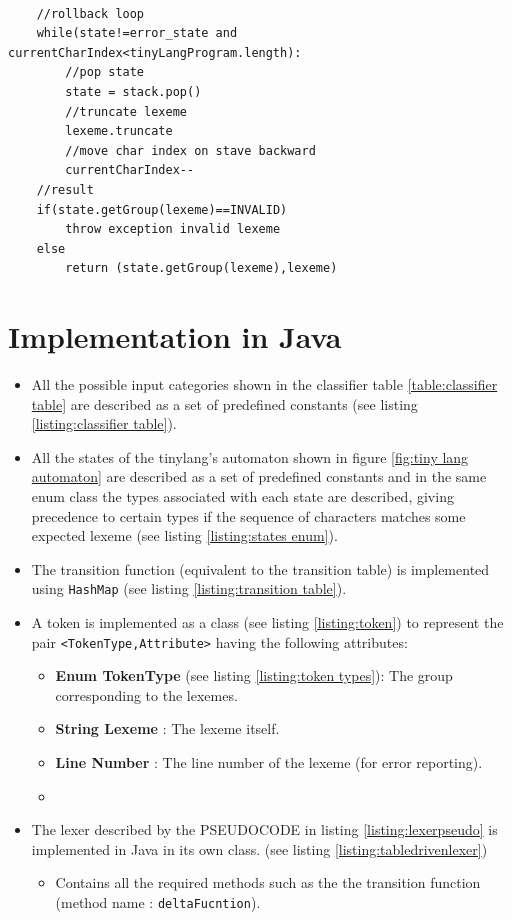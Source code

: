 \begin{lstlisting}[caption=Table Driven Lexer PSEUDOCODE,label=listing:lexerpseudo]
        
    //rollback loop
    while(state!=error_state and currentCharIndex<tinyLangProgram.length):
        //pop state
        state = stack.pop()
        //truncate lexeme
        lexeme.truncate
        //move char index on stave backward
        currentCharIndex--
    //result
    if(state.getGroup(lexeme)==INVALID)
        throw exception invalid lexeme
    else 
        return (state.getGroup(lexeme),lexeme)
\end{lstlisting}



\section{Implementation in Java}
\begin{itemize}
    \item All the possible input categories shown in the classifier table \ref{table:classifier table} are described as a set of predefined constants (see listing \ref{listing:classifier table}).    \item All the states of the tinylang's automaton shown in figure \ref{fig:tiny lang automaton}  are described as a set of predefined constants and in the same enum class the types associated with each state are described, giving precedence to certain types if the sequence of characters matches some expected lexeme (see listing \ref{listing:states enum}).
    \item The transition function (equivalent to the transition table) is implemented using \verb!HashMap! (see listing \ref{listing:transition table}).
    \item A token is implemented as a class (see listing \ref{listing:token}) to represent the pair \verb!<TokenType,Attribute>! having the following attributes:
    \begin{itemize}
        \item \textbf{Enum TokenType} (see listing \ref{listing:token types}): The group corresponding to the lexemes.
        \item \textbf{String Lexeme} : The lexeme itself.
        \item \textbf{Line Number} : The line number of the lexeme (for error reporting).
        \item \textbf{}
    \end{itemize}
    \item The lexer described by the PSEUDOCODE in listing \ref{listing:lexerpseudo} is implemented in Java in its own class. (see listing \ref{listing:tabledrivenlexer})
        \begin{itemize}
            \item Contains all the required methods such as the the transition function (method name : \verb!deltaFucntion!). 
        \end{itemize}
\end{itemize}



